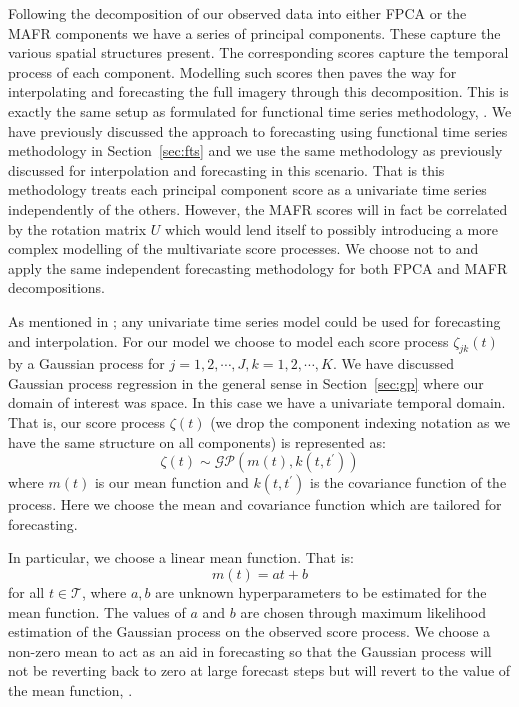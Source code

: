 Following the decomposition of our observed data into either FPCA or the MAFR components we have a series of principal components. 
These capture the various spatial structures present.
The corresponding scores capture the temporal process of each component.
Modelling such scores then paves the way for interpolating and forecasting the full imagery through this decomposition.
This is exactly the same setup as formulated for functional time series methodology, \citep{hyndman_forecasting_2009}.
We have previously discussed the approach to forecasting using functional time series methodology in Section~\ref{sec:fts} and we use the same methodology as previously discussed for interpolation and forecasting in this scenario.
That is this methodology treats each principal component score as a univariate time series independently of the others.
However, the MAFR scores will in fact be correlated by the rotation matrix $U$ which would lend itself to possibly introducing a more complex modelling of the multivariate score processes.
We choose not to and apply the same independent forecasting methodology for both FPCA and MAFR decompositions. 

As mentioned in \citep{hyndman_forecasting_2009}; any univariate time series model could be used for forecasting and interpolation. 
For our model we choose to model each score process $\zeta_{jk}(t)$ by a Gaussian process for $j=1,2,\cdots, J, k=1,2,\cdots,K$.
We have discussed Gaussian process regression in the general sense in Section~\ref{sec:gp} where our domain of interest was space.
In this case we have a univariate temporal domain. 
That is, our score process $\zeta(t)$ (we drop the component indexing notation as we have the same structure on all components) is represented as:
\begin{equation}
	\zeta(t) \sim \mathcal{GP}\left( m(t), k(t, t^\prime)\right)
\end{equation}
where $m(t)$ is our mean function and $k(t, t^\prime)$ is the covariance function of the process.
Here we choose the mean and covariance function which are tailored for forecasting.

In particular, we choose a linear mean function.
That is:
\begin{equation}
	m(t) = at + b
\end{equation}
for all $t \in \mathcal{T}$, where $a, b$ are unknown hyperparameters to be estimated for the mean function.
The values of $a$ and $b$ are chosen through maximum likelihood estimation of the Gaussian process on the observed score process. 
We choose a non-zero mean to act as an aid in forecasting so that the Gaussian process will not be reverting back to zero at large forecast steps but will revert to the value of the mean function, \citep{williams_gaussian_2006}. 

